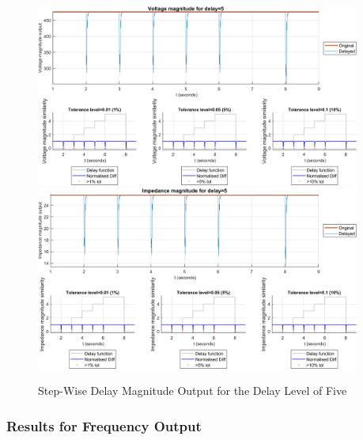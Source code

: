 \begin{figure}
    \caption{Step-Wise Delay Magnitude Output for the Delay Level of Five}
    \includegraphics[width=0.95\textwidth]{PMUsim-figures/DelayOf_5/Step_vMagnitude.png}    
      \includegraphics[width=0.95\textwidth]{PMUsim-figures/DelayOf_5/Step_iMagnitude.png}      
    \label{fig:PMUsimStep_Five_Magnitude}
    \begin{small}
     \end{small}
\end{figure}

\newpage \subsubsection{Results for Frequency Output}


